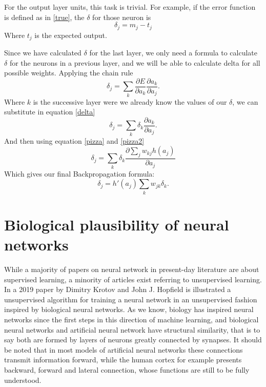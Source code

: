 \documentclass[a4paper]{report}
\begin{document}
For the output layer units, this task is trivial.
For example, if the error function is defined as in \ref{true}, the $\delta$ for those neuron is
\begin{equation}
\delta_j = m_j - t_j
\end{equation}
Where $t_j$ is the expected output.

Since we have calculated $\delta$ for the last layer, we only need a formula to calculate $\delta$ for the neurons in a previous layer, and we will be able to calculate delta for all possible weights.
Applying the chain rule
\begin{equation}
\delta_j = \sum_k \frac{\partial E}{\partial a_k} \frac{\partial a_k}{\partial a_j}.
\end{equation}
Where $k$ is the successive layer were we already know the values of our $\delta$, we can substitute in equation \ref{delta}
\begin{equation}
\delta_j = \sum_k\delta_k \frac{\partial a_k}{\partial a_j}.
\end{equation}
And then using equation \ref{pizza} and \ref{pizza2}
\begin{equation}
\delta_j = \sum_k \delta_k \frac{\partial \sum_j w_{kj} h(a_j)}{\partial a_j}
\end{equation}
Which gives our final Backpropagation formula:
\begin{equation}
\delta_j = h'(a_j)\sum_k w_{jk}\delta_k.
\end{equation}

\section{Biological plausibility of neural networks}
While a majority of papers on neural network in present-day literature are about supervised learning, a minority of articles exist referring to unsupervised learning.
In a 2019 paper by Dimitry Krotov and John J.
Hopfield is illustrated a unsupervised algorithm for training a neural network in an unsupervised fashion inspired by biological neural networks.
As we know, biology has inspired neural networks since the first steps in this direction of machine learning, and biological neural networks and artificial neural network have structural similarity, that is to say both are formed by layers of neurons greatly connected by synapses.
It should be noted that in most models of artificial neural networks these connections transmit information forward, while the human cortex for example presents backward, forward and lateral connection, whose functions are still to be fully understood.
\end{document}
